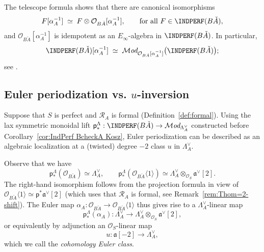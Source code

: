\documentclass[12pt, oneside]{amsart}
\numberwithin{equation}{section}
\theoremstyle{remark}
\theoremstyle{plain}
\newcommand{\MOD}{\mathcal{M}\textit{od}}
\newcommand{\R}{\mathcal{R}}
\newcommand{\RA}{\R_A}
\newcommand{\fra}{\mathfrak{a}}
\newcommand{\frav}{\mathfrak{a}^\vee}
\newcommand{\lamco}{\Lambda^\vee}
\newcommand{\OO}{\mathcal{O}}
\newcommand{\Thom}[1]{\langle #1 \rangle}
\newcommand{\sfp}{\mathsf{p}}
\begin{document}
The telescope formula shows that there are canonical isomorphisms
\[
  F[\alpha_A^{-1}] \;\simeq\; F \otimes \OO_{B\check{A}}[\alpha_A^{-1}],
  \qquad \text{for all } F \in \INDPERF(B\check{A}),
\]
and $\OO_{B\check{A}}[\alpha_A^{-1}]$ is idempotent as an $E_\infty$-algebra in $\INDPERF(B\check{A})$.
In particular,
\[ \INDPERF(B\check{A})[\alpha_A^{-1}] \;\simeq\; \MOD_{\OO_{B\check{A}}[\alpha_A^{-1}]}\bigl( \INDPERF(B\check{A}) \bigr); \]
see \cite[\S 4.8.2]{LurieHA}.

\subsection{Euler periodization vs. $u$-inversion}

Suppose that $S$ is perfect and $\RA$ is formal (Definition~\ref{def:formal}).
Using the lax symmetric monoidal lift $\sfp_*^{\Lambda} : \INDPERF(B\check{A}) \to \MOD_{\lamco_A}$ constructed before Corollary~\ref{cor:IndPerf BcheckA Kosz}, Euler periodization can be described as an algebraic localization at a (twisted) degree $-2$ class $u$ in $\lamco_A$.

Observe that we have
\[ \sfp_*^{\Lambda}(\OO_{B\check{A}}) \simeq \lamco_A, \qquad \sfp_*^{\Lambda}(\OO_{B\check{A}}\Thom{1}) \simeq \lamco_A \otimes_{\OO_S} \frav[2]. \]
The right-hand isomorphism follows from the projection formula in view of $\OO_{B\check{A}}\Thom{1} \simeq \sfp^*\frav[2]$ (which uses that $\RA$ is formal, see Remark~\ref{rem:Thom=2-shift}).
The Euler map $\alpha_A : \OO_{B\check{A}} \to \OO_{B\check{A}}\Thom{1}$ thus gives rise to a $\lamco_A$-linear map
$$\sfp_*^{\Lambda}(\alpha_A) : \lamco_A \to \lamco_A \otimes_{\OO_S} \frav[2],$$
or equivalently by adjunction an $\OO_S$-linear map
\[ u : \fra[-2] \to \lamco_A, \]
which we call the \emph{cohomology Euler class}.
\end{document}
